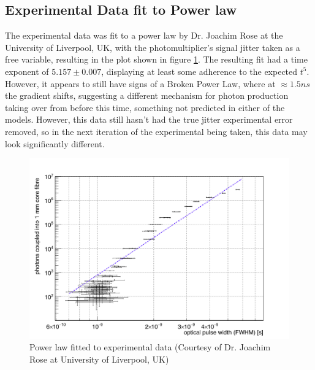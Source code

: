 \documentclass[titlepage]{article}
\begin{document}
\subsection{Experimental Data fit to Power law}
 The experimental data was fit to a power law by Dr. Joachim Rose at the University of Liverpool, UK, with the photomultiplier's signal jitter taken as a free variable, resulting in the plot shown in figure \ref{fig:exp:fit}. The resulting fit had a time exponent of $5.157 \pm 0.007$, displaying at least some adherence to the expected $t^5$. However, it appears to still have signs of a Broken Power Law, where at $\approx 1.5ns$ the gradient shifts, suggesting a different mechanism for photon production taking over from before this time, something not predicted in either of the models. However, this data still hasn't had the true jitter experimental error removed, so in the next iteration of the experimental being taken, this data may look significantly different.
 \begin{figure}[H]
 	\centering
 	\includegraphics[scale=0.25]{Figures/Experimental_Fit}
	 	\caption{Power law fitted to experimental data (Courtesy of Dr. Joachim Rose at University of Liverpool, UK)\label{fig:exp:fit}}
 \end{figure}
 
\end{document}
